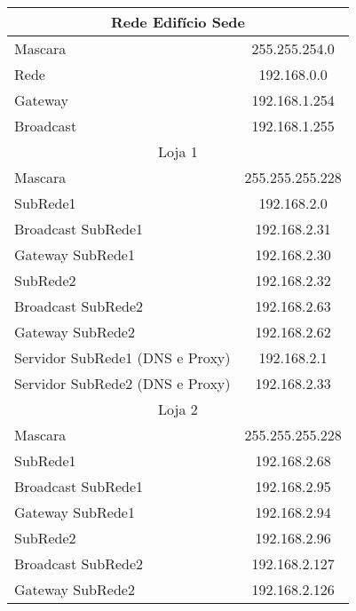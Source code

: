 \documentclass[a4paper,12pt]{article}
\begin{document}
						\begin{table}[ht]
						\centering
						\begin{tabular}{ l | c }
						\toprule
						\multicolumn{2}{c}{Rede Edifício Sede} \\\hline 
						Mascara & 255.255.254.0 \\\hline
						Rede & 192.168.0.0 \\\hline 
						Gateway & 192.168.1.254 \\\hline
						Broadcast & 192.168.1.255 \\\hline 

						\multicolumn{2}{c}{Loja 1} \\\hline 
						Mascara & 255.255.255.228 \\\hline
						
						SubRede1 & 192.168.2.0 \\\hline 
						Broadcast SubRede1 & 192.168.2.31 \\\hline
						Gateway SubRede1 & 192.168.2.30 \\\hline
					
						SubRede2 & 192.168.2.32 \\\hline 
						Broadcast SubRede2 & 192.168.2.63 \\\hline
						Gateway SubRede2 & 192.168.2.62 \\\hline
						
						Servidor SubRede1 (DNS e Proxy) & 192.168.2.1 \\\hline
						Servidor SubRede2 (DNS e Proxy) & 192.168.2.33 \\\hline
						
						\multicolumn{2}{c}{Loja 2} \\\hline 
						Mascara & 255.255.255.228 \\\hline
						
						SubRede1 & 192.168.2.68 \\\hline 
						Broadcast SubRede1 & 192.168.2.95 \\\hline
						Gateway SubRede1 & 192.168.2.94 \\\hline
					
						SubRede2 & 192.168.2.96\\\hline 
						Broadcast SubRede2 & 192.168.2.127 \\\hline
						Gateway SubRede2 & 192.168.2.126\\\hline
						

\end{tabular}
\end{table}
\end{document}
